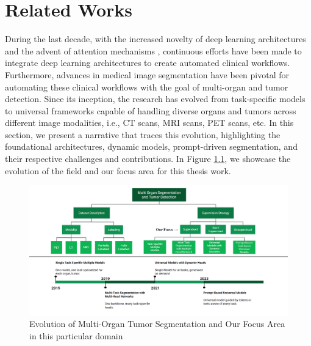 \documentclass{cls/iutbscthesis}
\begin{document}
\chapter{Related Works}
During the last decade, with the increased novelty of deep learning architectures and the advent of attention mechanisms \cite{vaswaniAttention}, continuous efforts have been made to integrate deep learning architectures to create automated clinical workflows. Furthermore, advances in medical image segmentation have been pivotal for automating these clinical workflows with the goal of multi-organ and tumor detection. Since its inception, the research has evolved from task-specific models to universal frameworks capable of handling diverse organs and tumors across different image modalities, i.e., CT scans, MRI scans, PET scans, etc. In this section, we present a narrative that traces this evolution, highlighting the foundational architectures, dynamic models, prompt-driven segmentation, and their respective challenges and contributions. In Figure \ref{fig:taxonomy-and-chronology}, we showcase the evolution of the field and our focus area for this thesis work.
\begin{figure}[h!]
    \centering
    \includegraphics[width=1\linewidth]{figs/taxonomy.png}
    \caption{Evolution of Multi-Organ Tumor Segmentation and Our Focus Area in this particular domain}
    \label{fig:taxonomy-and-chronology}
\end{figure}
\end{document}
